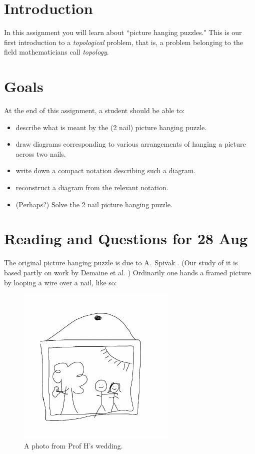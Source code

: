 \documentclass[12pt,letterpaper]{article}
\theoremstyle{definition}
\begin{document}
\setlength{\parskip}{1ex plus 0.5ex minus 0.2ex}
\setlength{\parindent}{0pt}

\pagestyle{fancy}
\cfoot{} 

\section*{Introduction}
In this assignment you will learn about ``picture hanging puzzles."
This is our first introduction to a \emph{topological} problem, that is, a problem belonging to the field mathematicians call \emph{topology}.

\section*{Goals}
At the end of this assignment, a student should be able to:
\begin{itemize}
\item describe what is meant by the (2 nail) picture hanging puzzle.
\item draw diagrams corresponding to various arrangements of hanging a picture across two nails.
\item write down a compact notation describing such a diagram.
\item reconstruct a diagram from the relevant notation.
\item (Perhaps?) Solve the 2 nail picture hanging puzzle.
\end{itemize}

\section*{Reading and Questions for 28 Aug}

The original picture hanging puzzle is due to A.~Spivak \cite{Spivak}.
(Our study of it is based partly on work by Demaine et al. \cite{Demaine})
Ordinarily one hands a framed picture by looping a wire over a nail, like so:
\begin{figure}[h]
    \centering
    \includegraphics[height=3in]{rgp01pics/wedding.png}
    \caption{A photo from Prof H's wedding.}
\end{figure}
 
\end{document}
